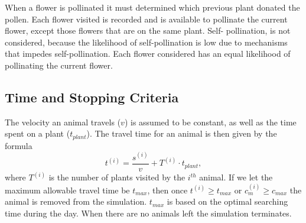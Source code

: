   When a flower is pollinated it must determined which previous plant donated the pollen. Each
  flower visited is recorded and is available to pollinate the current flower, except those flowers
  that are on the same plant. Self- pollination, is not considered, because the likelihood of
  self-pollination is low due to mechanisms that impedes self-pollination. Each flower considered
  has an equal likelihood of pollinating the current flower.

\subsection{Time and Stopping Criteria}
  The velocity an animal travels ($v$) is assumed to be constant, as well as the time spent on a
  plant ($t_{plant}$).  The travel time for an animal is then given by the formula
  \[
    t^{\left(i\right)} = \frac{s^{\left(i\right)}}{v} + T^{\left(i\right)} \cdot t_{plant},
  \]
  where $T^{\left(i\right)}$ is the number of plants visited by the $i^{th}$ animal. If we let the
  maximum allowable travel time be $t_{max}$, then once $t^{\left(i\right)} \geq t_{max}$ or
  $c^{\left(i\right)}_m \geq c_{max}$ the animal is removed from the simulation. $t_{max}$ is based
  on the optimal searching time during the day.  When there are no animals left the simulation
  terminates.


